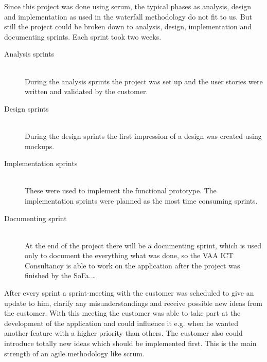 Since this project was done using scrum, the typical phases as analysis, design and implementation as used in the waterfall methodology do not fit to us. But still the project could be broken down to analysis, design, implementation and documenting sprints. Each sprint took two weeks. 
\begin{description}
	\item[Analysis sprints] \hfill \\
	During the analysis sprints the project was set up and the user stories were written and validated by the customer. 
	\item[Design sprints] \hfill \\
	During the design sprints the first impression of a design was created using mockups. 
	\item[Implementation sprints] \hfill \\
	These were used to implement the functional prototype. The implementation sprints were planned as the most time consuming sprints.
	\item[Documenting sprint] \hfill \\
	At the end of the project there will be a documenting sprint, which is used only to document the everything what was done, so the VAA ICT Consultancy is able to work on the application after the project was finished by the SoFa.\ldots
\end{description}

After every sprint a sprint-meeting with the customer was scheduled to give an update to him, clarify any misunderstandings and receive possible new ideas from the customer. With this meeting the customer was able to take part at the development of the application and could influence it e.g. when he wanted another feature with a higher priority than others. The customer also could introduce totally new ideas which should be implemented first. This is the main strength of an agile methodology like scrum.